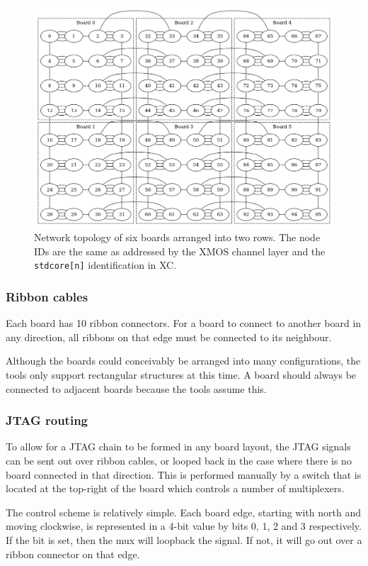 \documentclass[12pt,a4paper,final,twoside]{article}
\begin{document}
\begin{figure}[htb]
\centering
\includegraphics[scale=0.5]{xmp16-3x2-fixed.png}
\caption{Network topology of six boards arranged into two rows. The node IDs are the same as addressed by the XMOS channel layer and the \texttt{stdcore[n]} identification in XC.}
\end{figure}

\subsubsection{Ribbon cables}

Each board has 10 ribbon connectors. For a board to connect to another board in any direction, all ribbons on that edge must be connected to its neighbour.

Although the boards could conceivably be arranged into many configurations, the tools only support rectangular structures at this time. A board should always be connected to adjacent boards because the tools assume this.

\subsubsection{JTAG routing}

To allow for a JTAG chain to be formed in any board layout, the JTAG signals can be sent out over ribbon cables, or looped back in the case where there is no board connected in that direction. This is performed manually by a switch that is located at the top-right of the board which controls a number of multiplexers.

The control scheme is relatively simple. Each board edge, starting with north and moving clockwise, is represented in a 4-bit value by bits 0, 1, 2 and 3 respectively. If the bit is set, then the mux will loopback the signal. If not, it will go out over a ribbon connector on that edge.
\end{document}
